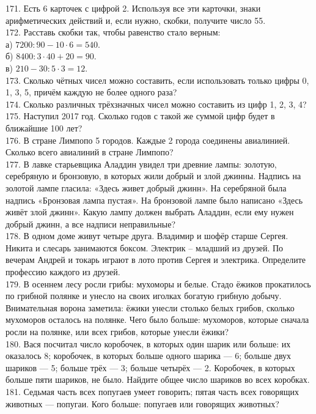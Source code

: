 171. Есть 6 карточек с цифрой 2. Используя все эти карточки, знаки арифметических действий и, если нужно, скобки, получите число 55.\\
172. Расставь скобки так, чтобы равенство стало верным:\\
а) $7200:90-10\cdot6=540.$\\
б) $8400:3\cdot40+20=90.$\\
в) $210-30:5\cdot3=12.$\\
173. Сколько чётных чисел можно составить, если использовать только цифры 0, 1, 3, 5, причём каждую не более одного раза?\\
174. Сколько различных трёхзначных чисел можно составить из цифр 1, 2, 3, 4?\\
175. Наступил 2017 год. Сколько годов с такой же суммой цифр будет в ближайшие 100 лет?\\
176. В стране Лимпопо 5 городов. Каждые 2 города соединены авиалинией. Сколько всего авиалиний в стране Лимпопо?\\
177. В лавке старьевщика Аладдин увидел три древние лампы: золотую, серебряную и бронзовую, в которых жили добрый и злой джинны. Надпись на золотой лампе гласила: «Здесь живет добрый джинн». На серебряной была надпись «Бронзовая лампа пустая». На бронзовой лампе было написано «Здесь живёт злой джинн». Какую лампу должен выбрать Аладдин, если ему нужен добрый джинн, а все надписи неправильные?\\
178. В одном доме живут четыре друга. Владимир и шофёр старше Сергея. Никита и слесарь занимаются боксом. Электрик – младший из друзей. По вечерам Андрей и токарь играют в лото против Сергея и электрика. Определите профессию каждого из друзей.\\
179. В осеннем лесу росли грибы: мухоморы и белые. Стадо ёжиков прокатилось по грибной полянке и унесло на своих иголках богатую грибную добычу. Внимательная ворона заметила: ёжики унесли столько белых грибов, сколько мухоморов осталось на полянке. Чего было больше: мухоморов, которые сначала росли на полянке, или всех грибов, которые унесли ёжики?\\
180. Вася посчитал число коробочек, в которых один шарик или больше: их оказалось 8; коробочек, в которых больше одного шарика --- 6; больше двух шариков --- 5; больше трёх --- 3; больше четырёх --- 2. Коробочек, в которых больше пяти шариков, не было. Найдите общее число шариков во всех коробках.\\
181. Седьмая часть всех попугаев умеет говорить; пятая часть всех говорящих животных --- попугаи. Кого больше: попугаев или говорящих животных?\\
